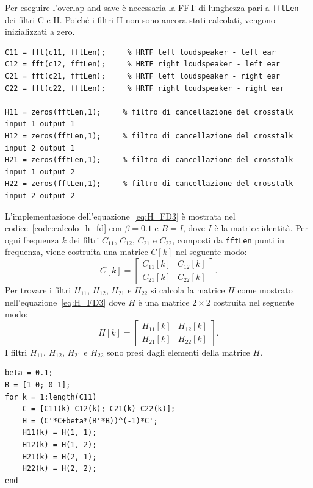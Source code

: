 \documentclass[12pt,a4paper,titlepage]{article}
\begin{document}
Per eseguire l'overlap and save è necessaria la FFT di lunghezza pari a \texttt{fftLen} dei filtri C e H. Poiché i filtri H non sono ancora stati calcolati, vengono inizializzati a zero.

\begin{lstlisting}[label=code:fft_hrir, caption=FFT delle risposte impulsive del canale e inizializzazione dei filtri di cancellazione del crosstalk, captionpos=b]
C11 = fft(c11, fftLen);     % HRTF left loudspeaker - left ear
C12 = fft(c12, fftLen);     % HRTF right loudspeaker - left ear
C21 = fft(c21, fftLen);     % HRTF left loudspeaker - right ear
C22 = fft(c22, fftLen);     % HRTF right loudspeaker - right ear

H11 = zeros(fftLen,1);     % filtro di cancellazione del crosstalk input 1 output 1
H12 = zeros(fftLen,1);     % filtro di cancellazione del crosstalk input 2 output 1
H21 = zeros(fftLen,1);     % filtro di cancellazione del crosstalk input 1 output 2
H22 = zeros(fftLen,1);     % filtro di cancellazione del crosstalk input 2 output 2
\end{lstlisting}

L'implementazione dell'equazione~\eqref{eq:H_FD3} è mostrata nel codice~\ref{code:calcolo_h_fd} con $\beta = 0.1$ e $B = I$, dove $I$ è la matrice identità. Per ogni frequenza $k$ dei filtri $C_{11}$, $C_{12}$, $C_{21}$ e $C_{22}$, composti da \texttt{fftLen} punti in frequenza, viene costruita una matrice $C [k]$ nel seguente modo:
\begin{equation*}
C [k] =
\begin{bmatrix}
C_{11}[k]	& C_{12}[k]\\
C_{21}[k]	& C_{22}[k]
\end{bmatrix}.
\end{equation*}
Per trovare i filtri $H_{11}$, $H_{12}$, $H_{21}$ e $H_{22}$ si calcola la matrice $H$ come mostrato nell'equazione~\eqref{eq:H_FD3} dove $H$ è una matrice $2 \times 2$ costruita nel seguente modo:
\begin{equation*}
H [k] =
\begin{bmatrix}
H_{11}[k]	& H_{12}[k]\\
H_{21}[k]	& H_{22}[k]
\end{bmatrix}.
\end{equation*}
I filtri $H_{11}$, $H_{12}$, $H_{21}$ e $H_{22}$ sono presi dagli elementi della matrice $H$.

\begin{lstlisting}[label=code:calcolo_h_fd, caption=Calcolo dei filtri di cancellazione del crosstalk, captionpos=b]
beta = 0.1;
B = [1 0; 0 1];
for k = 1:length(C11)
    C = [C11(k) C12(k); C21(k) C22(k)];
    H = (C'*C+beta*(B'*B))^(-1)*C'; 
    H11(k) = H(1, 1);
    H12(k) = H(1, 2);
    H21(k) = H(2, 1);
    H22(k) = H(2, 2);
end
\end{lstlisting}
\end{document}
